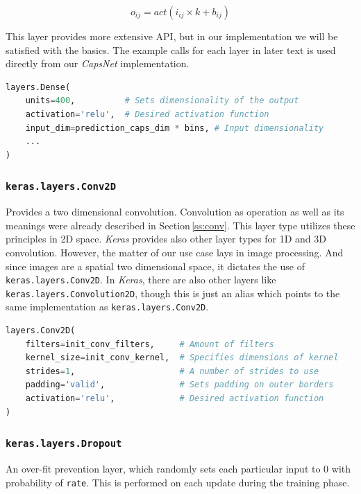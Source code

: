 \begin{equation}
    o_{ij} = act(i_{ij} \times k + b_{ij})
    \label{eq:dense}
\end{equation}

This layer provides more extensive API, but in our implementation we will be satisfied with the basics. The example calls for each layer in later text is used directly from our \textit{CapsNet} implementation.

\begin{lstlisting}[language=Python, caption=Dense layer.]
layers.Dense(
    units=400,          # Sets dimensionality of the output
    activation='relu',  # Desired activation function
    input_dim=prediction_caps_dim * bins, # Input dimensionality
    ...
)
\end{lstlisting}

\subsubsection{\texttt{keras.layers.Conv2D}}

Provides a two dimensional convolution. Convolution as operation as well as its meanings were already described in Section\,\ref{ss:conv}. This layer type utilizes these principles in 2D space. \textit{Keras} provides also other layer types for 1D and 3D convolution. However, the matter of our use case lays in image processing. And since images are a spatial two dimensional space, it dictates the use of \texttt{keras.layers.Conv2D}. In \textit{Keras}, there are also other layers like \texttt{keras.layers.Convolution2D}, though this is just an alias which points to the same implementation as \texttt{keras.layers.Conv2D}.

\begin{lstlisting}[language=Python, caption=2D convolution layer,]
layers.Conv2D(
    filters=init_conv_filters,     # Amount of filters
    kernel_size=init_conv_kernel,  # Specifies dimensions of kernel
    strides=1,                     # A number of strides to use
    padding='valid',               # Sets padding on outer borders
    activation='relu',             # Desired activation function
)
\end{lstlisting}

\subsubsection{\texttt{keras.layers.Dropout}}

An over-fit prevention layer, which randomly sets each particular input to 0 with probability of \texttt{rate}. This is performed on each update during the training phase.


